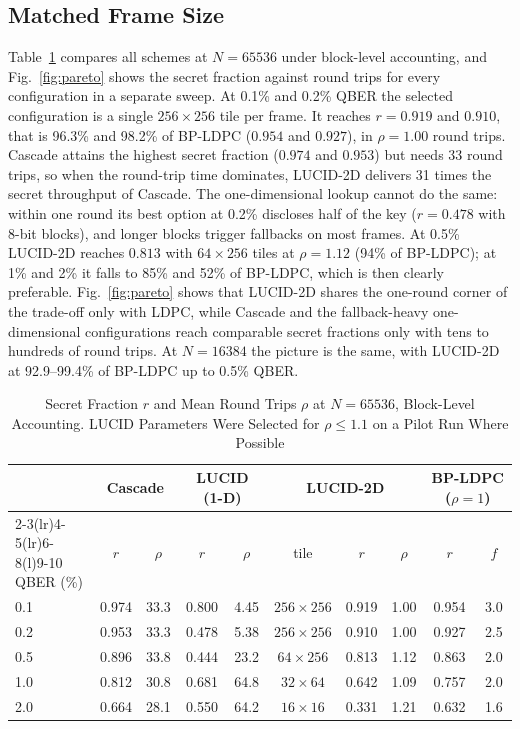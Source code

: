 \documentclass[conference]{IEEEtran}
\begin{document}
\subsection{Matched Frame Size}
Table~\ref{tab:matched} compares all schemes at $N=65536$ under block-level accounting, and Fig.~\ref{fig:pareto} shows the secret fraction against round trips for every configuration in a separate sweep. At 0.1\% and 0.2\% QBER the selected configuration is a single $256\times256$ tile per frame. It reaches $r=0.919$ and $0.910$, that is 96.3\% and 98.2\% of BP-LDPC ($0.954$ and $0.927$), in $\rho=1.00$ round trips. Cascade attains the highest secret fraction ($0.974$ and $0.953$) but needs 33 round trips, so when the round-trip time dominates, LUCID-2D delivers 31 times the secret throughput of Cascade. The one-dimensional lookup cannot do the same: within one round its best option at 0.2\% discloses half of the key ($r=0.478$ with 8-bit blocks), and longer blocks trigger fallbacks on most frames. At 0.5\% LUCID-2D reaches $0.813$ with $64\times256$ tiles at $\rho=1.12$ (94\% of BP-LDPC); at 1\% and 2\% it falls to 85\% and 52\% of BP-LDPC, which is then clearly preferable. Fig.~\ref{fig:pareto} shows that LUCID-2D shares the one-round corner of the trade-off only with LDPC, while Cascade and the fallback-heavy one-dimensional configurations reach comparable secret fractions only with tens to hundreds of round trips. At $N=16384$ the picture is the same, with LUCID-2D at 92.9--99.4\% of BP-LDPC up to 0.5\% QBER.

\begin{table}[t]
\caption{Secret Fraction $r$ and Mean Round Trips $\rho$ at $N=65536$, Block-Level Accounting. LUCID Parameters Were Selected for $\rho\le1.1$ on a Pilot Run Where Possible}
\label{tab:matched}
\centering
\begin{tabular}{@{}lccccccccc@{}}
\toprule
& \multicolumn{2}{c}{Cascade} & \multicolumn{2}{c}{LUCID (1-D)} & \multicolumn{3}{c}{LUCID-2D} & \multicolumn{2}{c}{BP-LDPC ($\rho=1$)}\\
\cmidrule(lr){2-3}\cmidrule(lr){4-5}\cmidrule(lr){6-8}\cmidrule(l){9-10}
QBER (\%) & $r$ & $\rho$ & $r$ & $\rho$ & tile & $r$ & $\rho$ & $r$ & $f$\\
\midrule
0.1 & 0.974 & 33.3 & 0.800 & 4.45 & $256{\times}256$ & 0.919 & 1.00 & 0.954 & 3.0 \\
0.2 & 0.953 & 33.3 & 0.478 & 5.38 & $256{\times}256$ & 0.910 & 1.00 & 0.927 & 2.5 \\
0.5 & 0.896 & 33.8 & 0.444 & 23.2 & $64{\times}256$ & 0.813 & 1.12 & 0.863 & 2.0 \\
1.0 & 0.812 & 30.8 & 0.681 & 64.8 & $32{\times}64$ & 0.642 & 1.09 & 0.757 & 2.0 \\
2.0 & 0.664 & 28.1 & 0.550 & 64.2 & $16{\times}16$ & 0.331 & 1.21 & 0.632 & 1.6 \\
\bottomrule
\end{tabular}
\end{table}
\end{document}
